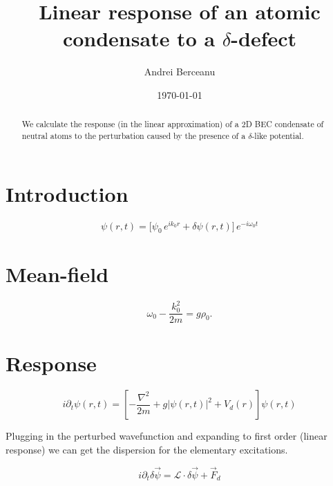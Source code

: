 \documentclass[a4paper,prb,10pt,aps]{revtex4-1}
\begin{document}
\title{Linear response of an atomic condensate to a $\delta$-defect}
\author{Andrei Berceanu}

\date{\today}

\begin{abstract}
We calculate the response (in the linear approximation) of a 2D BEC condensate of neutral atoms to the perturbation caused by the presence of a $\delta$-like potential.
\end{abstract}


\section{Introduction}


\begin{equation}
  \label{eq:3}
\psi(r,t)=\big[\psi_{0}\, e^{ik_{0}r}+\delta\psi(r,t)\big]\, e^{-i\omega_{0}t}
\end{equation}


\section{Mean-field}
\begin{equation}
  \label{eq:12}
\omega_{0}-\frac{k_{0}^{2}}{2m}=g\rho_{0}.  
\end{equation}

\section{Response}

\begin{equation}
  \label{eq:13}
i\partial_{t}\psi(r,t)=\left[-\frac{\nabla^{2}}{2m}+g\left|\psi(r,t)\right|^{2}+V_{d}(r)\right]\psi(r,t)  
\end{equation}

Plugging in the perturbed wavefunction and expanding to first order (linear response) we can get the dispersion for the elementary excitations. 

\begin{equation}
  \label{eq:16}
i\partial_{t}\delta\vec{\psi}=\mathcal{L}\cdot\delta\vec{\psi}+\vec{F}_{d}  
\end{equation}
\end{document}
